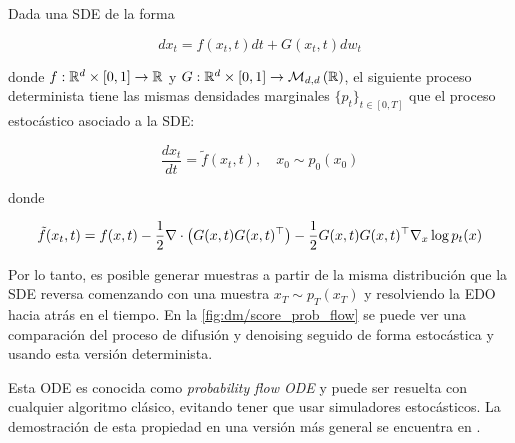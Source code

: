 \begin{prop}

    Dada una SDE de la forma

    \begin{equation}
        dx_t = f(x_t,t)dt + G(x_t,t)dw_t
    \end{equation}

    donde $f:\mathbb{R}^d\times[0,1]\to\mathbb{R}$ y $G:\mathbb{R}^d\times[0,1]\to\mathcal{M}_{d,d}\left(\mathbb{R}\right)$, el siguiente proceso determinista tiene las mismas densidades marginales $\{p_t\}_{t\in[0,T]}$ que el proceso estocástico asociado a la SDE:

    \begin{equation}
        \frac{dx_t}{dt} = \tilde{f}(x_t,t), \quad x_0\sim p_0(x_0)
    \end{equation}

    donde

    \begin{equation}
        \tilde{f}(x_t,t) = f(x,t) - \frac{1}{2}\nabla\cdot\left(G(x,t)G(x,t)^\top\right) - \frac{1}{2} G(x,t)G(x,t)^\top \nabla_{x} \log p_t(x)
    \end{equation}

\end{prop}

Por lo tanto, es posible generar muestras a partir de la misma distribución que la SDE reversa comenzando con una muestra $x_T\sim p_T(x_T)$ y resolviendo la EDO hacia atrás en el tiempo. En la \autoref{fig:dm/score_prob_flow} se puede ver una comparación del proceso de difusión y denoising seguido de forma estocástica y usando esta versión determinista.


Esta ODE es conocida como \textit{probability flow ODE} y puede ser resuelta con cualquier algoritmo clásico, evitando tener que usar simuladores estocásticos. La demostración de esta propiedad en una versión más general se encuentra en \cite{song2021scorebased}.

